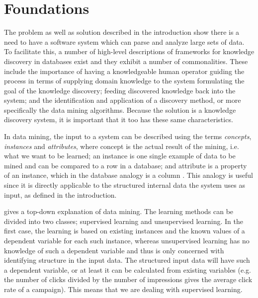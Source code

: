 \documentclass{sig-alternate}
\begin{document}
\section{Foundations}
\label{ch:Foundations}
The problem as well as solution described in the introduction show there is a need to have a software system which can parse and analyze large sets of data. To facilitate this, a number of high-level descriptions of frameworks for knowledge discovery in databases exist \citep{Fayyad1996, Frawley1992} and they exhibit a number of commonalities. These include the importance of having a knowledgeable human operator guiding the process in terms of supplying domain knowledge to the system formulating the goal of the knowledge discovery; feeding discovered knowledge back into the system; and the identification and application of a discovery method, or more specifically the data mining algorithms. Because the solution is a knowledge discovery system, it is important that it too has these same characteristics.

In data mining, the input to a system can be described using the terms \emph{concepts}, \emph{instances} and \emph{attributes}, where concept is the actual result of the mining, i.e. what we want to be learned; an instance is one single example of data to be mined and can be compared to a row in a database; and attribute is a property of an instance, which in the database analogy is a column \citep{Witten2011}. This analogy is useful since it is directly applicable to the structured internal data the system uses as input, as defined in the introduction.

\cite{Kantardzic2011} gives a top-down explanation of data mining. The learning methods can be divided into two classes; supervised learning and unsupervised learning. In the first case, the learning is based on existing instances and the known values of a dependent variable for each such instance, whereas unsupervised learning has no knowledge of such a dependent variable and thus is only concerned with identifying structure in the input data. The structured input data will have such a dependent variable, or at least it can be calculated from existing variables (e.g. the number of clicks divided by the number of impressions gives the average click rate of a campaign). This means that we are dealing with supervised learning.
\end{document}
